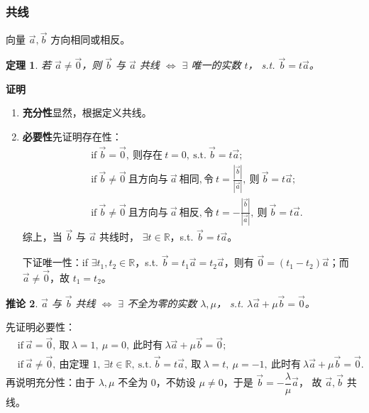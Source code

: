\documentclass[UTF8,11pt]{ctexart}
\theoremstyle{cnthm}
\newtheorem{thm}{定理}[section]
\newtheorem{cor}[thm]{推论}
\begin{document}
\subsubsection*{共线}

向量 $\vec a,\vec b$ 方向相同或相反。

\begin{thm}
若 $\vec a\neq\vec 0$，则 $\vec b$ 与
$\vec a$ 共线 $\Longleftrightarrow$ $\exists$ 唯一的实数 $t$，
s.t. $\vec b=t\vec a$。
\end{thm}

\textbf{证明}\quad

\begin{enumerate}
\item \textbf{充分性}\quad 显然，根据定义共线。
\item \textbf{必要性}\quad 先证明存在性：
\[
\begin{aligned}
&\text{if}\ \vec b=\vec 0,\ \text{则存在}\ t=0,\
\text{s.t.}\ \vec b=t\vec a;\\
&\text{if}\ \vec b\neq\vec 0\ \text{且方向与}\ \vec a\ \text{相同},
\text{令}\ t=\frac{|\vec b|}{|\vec a|},\ \text{则}\ \vec b=t\vec a;\\
&\text{if}\ \vec b\neq\vec 0\ \text{且方向与}\ \vec a\ \text{相反},
\text{令}\ t=-\frac{|\vec b|}{|\vec a|},\ \text{则}\ \vec b=t\vec a .
\end{aligned}
\]
综上，当 $\vec b$ 与 $\vec a$ 共线时，
$\exists t\in\mathbb R$，s.t. $\vec b=t\vec a$。

下证唯一性：if $\exists t_1,t_2\in\mathbb R$，s.t.
$\vec b=t_1\vec a=t_2\vec a$，则有
$\vec 0=(t_1-t_2)\vec a$；而 $\vec a\neq\vec 0$，故
$t_1=t_2$。
\end{enumerate}

\begin{cor}
$\vec a$ 与 $\vec b$ 共线
$\Longleftrightarrow$ $\exists$ 不全为零的实数 $\lambda,\mu$，
s.t. $\lambda\vec a+\mu\vec b=\vec 0$。
\end{cor}

先证明必要性：
\[
\begin{aligned}
&\text{if}\ \vec a=\vec 0,\ \text{取}\ \lambda=1,\ \mu=0,\
\text{此时有}\ \lambda\vec a+\mu\vec b=\vec 0;\\
&\text{if}\ \vec a\neq\vec 0,\ \text{由定理 1},\
\exists t\in\mathbb R,\ \text{s.t.}\ \vec b=t\vec a,\
\text{取}\ \lambda=t,\ \mu=-1,\ \text{此时有}\
\lambda\vec a+\mu\vec b=\vec 0 .
\end{aligned}
\]
再说明充分性：由于 $\lambda,\mu$ 不全为 $0$，不妨设
$\mu\neq0$，于是 $\vec b=-\dfrac{\lambda}{\mu}\vec a$，
故 $\vec a,\vec b$ 共线。
\end{document}
